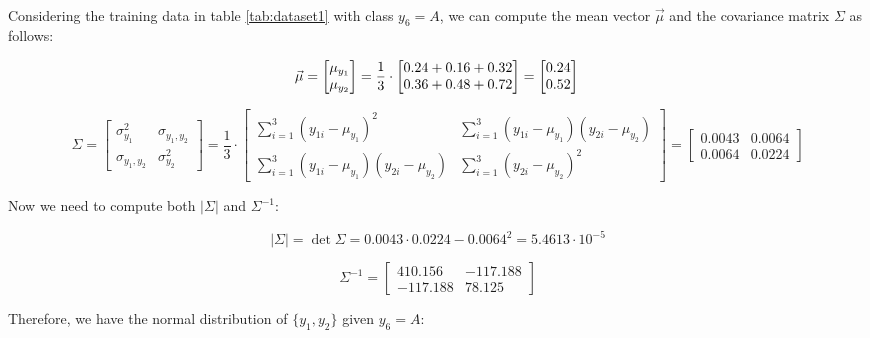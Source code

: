 \documentclass{article}
\begin{document}
\paragraph{}

Considering the training data in table \ref{tab:dataset1} with class $y_6=A$, we can compute the mean vector $\vec{\mu}$ and the covariance matrix $\Sigma$ as follows:

\[
  \vec{\mu} =  \left[\begin{matrix} \mu_{y_1} \\ \mu_{y_2} \end{matrix} \right]= \frac{1}{3} \cdot 
  \left[\begin{matrix}
    0.24 + 0.16 + 0.32 \\
    0.36 + 0.48 + 0.72
  \end{matrix}\right] = \left[\begin{matrix}
    0.24 \\
    0.52
  \end{matrix}\right] \\
\]

\[
  \Sigma = \left[ \begin{matrix}
    \sigma_{y_1}^2 & \sigma_{y_1,y_2} \\
    \sigma_{y_1,y_2} & \sigma_{y_2}^2
  \end{matrix} \right] = \frac{1}{3} \cdot \begin{bmatrix}
    \sum_{i=1}^{3} (y_{1i} - \mu_{y_1})^2 & \sum_{i=1}^{3} (y_{1i} - \mu_{y_1})(y_{2i} - \mu_{y_2}) \\
    \sum_{i=1}^{3} (y_{1i} - \mu_{y_1})(y_{2i} - \mu_{y_2}) & \sum_{i=1}^{3} (y_{2i} - \mu_{y_2})^2
  \end{bmatrix}  = \begin{bmatrix}
    0.0043 & 0.0064 \\
    0.0064 & 0.0224
  \end{bmatrix}
\]

Now we need to compute both $|\Sigma|$ and $\Sigma^{-1}$:

\[
  |\Sigma| = \det \Sigma = 0.0043 \cdot 0.0224 - 0.0064^2 = 5.4613 \cdot 10^{-5}
\]

\[
  \Sigma^{-1} = \begin{bmatrix}
    410.156 & -117.188 \\
    -117.188 & 78.125
  \end{bmatrix}
\]

Therefore, we have the normal distribution of $\{y_1,y_2\}$ given $y_6=A$:
\end{document}
